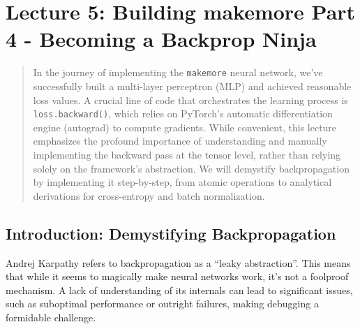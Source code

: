 
\section{Lecture 5: Building makemore Part 4 - Becoming a Backprop Ninja}

\begin{abstract}
In the journey of implementing the \texttt{makemore} neural network, we've successfully built a multi-layer perceptron (MLP) and achieved reasonable loss values. A crucial line of code that orchestrates the learning process is \texttt{loss.backward()}, which relies on PyTorch's automatic differentiation engine (autograd) to compute gradients. While convenient, this lecture emphasizes the profound importance of understanding and manually implementing the backward pass at the tensor level, rather than relying solely on the framework's abstraction. We will demystify backpropagation by implementing it step-by-step, from atomic operations to analytical derivations for cross-entropy and batch normalization.
\end{abstract}

\subsection{Introduction: Demystifying Backpropagation}

Andrej Karpathy refers to backpropagation as a ``leaky abstraction''. This means that while it seems to magically make neural networks work, it's not a foolproof mechanism. A lack of understanding of its internals can lead to significant issues, such as suboptimal performance or outright failures, making debugging a formidable challenge.

